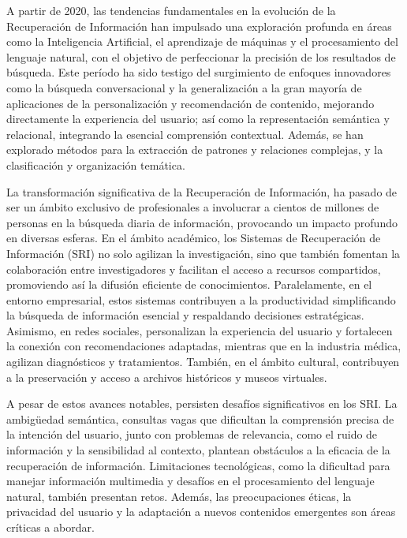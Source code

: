A partir de 2020, las tendencias fundamentales en la evolución de la Recuperación de Información han impulsado una exploración profunda en áreas como la Inteligencia Artificial, el aprendizaje de máquinas y el procesamiento del lenguaje natural, con el objetivo de perfeccionar la precisión de los resultados de búsqueda. Este período ha sido testigo del surgimiento de enfoques innovadores como la búsqueda conversacional y la generalizaci\'on a la gran mayor\'ia de aplicaciones de la personalización y recomendación de contenido, mejorando directamente la experiencia del usuario; así como la representación semántica y relacional, integrando la esencial comprensión contextual. Además, se han explorado métodos para la extracción de patrones y relaciones complejas, y la clasificación y organización temática.

La transformación significativa de la Recuperaci\'on de Informaci\'on, ha pasado de ser un ámbito exclusivo de profesionales a involucrar a cientos de millones de personas en la búsqueda diaria de información, provocando un impacto profundo en diversas esferas. En el ámbito académico, los  Sistemas de Recuperaci\'on de Informaci\'on (SRI) no solo agilizan la investigación, sino que también fomentan la colaboración entre investigadores y facilitan el acceso a recursos compartidos, promoviendo así la difusión eficiente de conocimientos. Paralelamente, en el entorno empresarial, estos sistemas contribuyen a la productividad simplificando la búsqueda de información esencial y respaldando decisiones estratégicas. Asimismo, en redes sociales, personalizan la experiencia del usuario y fortalecen la conexión con recomendaciones adaptadas, mientras que en la industria médica, agilizan diagnósticos y tratamientos. Tambi\'en, en el ámbito cultural, contribuyen a la preservación y acceso a archivos históricos y museos virtuales. 

A pesar de estos avances notables, persisten desafíos significativos en los SRI. La ambigüedad semántica, consultas vagas que dificultan la comprensión precisa de la intención del usuario, junto con problemas de relevancia, como el ruido de información y la sensibilidad al contexto, plantean obstáculos a la eficacia de la recuperación de información. Limitaciones tecnológicas, como la dificultad para manejar información multimedia y desafíos en el procesamiento del lenguaje natural, también presentan retos. Además, las preocupaciones éticas, la privacidad del usuario y la adaptación a nuevos contenidos emergentes son áreas críticas a abordar. 

